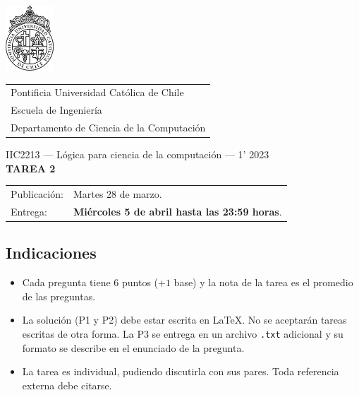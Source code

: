 \documentclass{article}
\begin{document}
\includegraphics[width=1.8cm]{uc.png}
\vspace*{-1.9cm}

\hspace*{2.1cm}
 \begin{tabular}{l}
  \sc Pontificia Universidad Católica de Chile \\
  \sc Escuela de Ingeniería \\
  \sc Departamento de Ciencia de la Computación
 \end{tabular}
 \bigskip

\vspace*{5mm}
\begin{center}
{IIC2213 --- Lógica para ciencia de la computación --- 1' 2023} \\
\vspace{3mm}
{\Large\bf TAREA 2} \\
\vspace{2mm}
\end{center}

\begin{tabular}{ll}
Publicación: & Martes 28 de marzo. \\
Entrega: & \textbf{Miércoles 5 de abril hasta las 23:59 horas}. \\
\end{tabular}

\subsection*{Indicaciones}

\begin{itemize}
\item Cada pregunta tiene 6 puntos ($+1$ base) y la nota de la tarea es el promedio de  las preguntas.
\item La solución (P1 y P2) debe estar escrita en \LaTeX. No se aceptarán tareas escritas de otra forma. La P3 se entrega en un archivo \texttt{.txt} adicional y su formato se describe en el enunciado de la pregunta.
\item La tarea es individual, pudiendo discutirla con sus pares. Toda referencia externa debe citarse.
\end{itemize}
\end{document}
